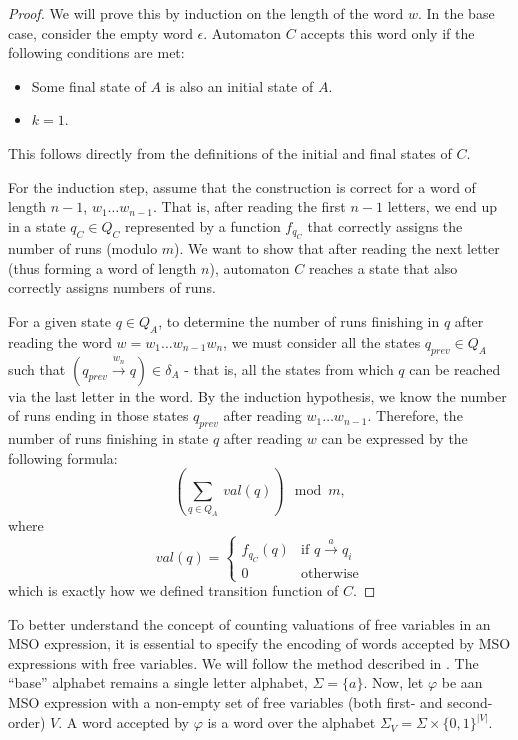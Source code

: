 \documentclass[12pt]{article}
\theoremstyle{definition}
\begin{document}
\begin{proof}
    We will prove this by induction on the length of the word $w$. In the base case, consider the empty word $\epsilon$. Automaton $C$ accepts this word only if the following conditions are met:
    \begin{itemize}
        \item Some final state of $A$ is also an initial state of $A$.
        \item $k = 1$.
    \end{itemize}
    This follows directly from the definitions of the initial and final states of $C$.
    
    For the induction step, assume that the construction is correct for a word of length $n-1$, $w_1 \ldots w_{n-1}$. That is, after reading the first $n-1$ letters, we end up in a state $q_C \in Q_C$ represented by a function $f_{q_C}$ that correctly assigns the number of runs (modulo $m$). We want to show that after reading the next letter (thus forming a word of length $n$), automaton $C$ reaches a state that also correctly assigns numbers of runs. 
    
    For a given state $q \in Q_A$, to determine the number of runs finishing in $q$ after reading the word $w = w_1\ldots w_{n-1}w_n$, we must consider all the states $q_{prev} \in Q_A$ such that $(q_{prev} \xrightarrow{w_n} q) \in \delta_A$ - that is, all the states from which $q$ can be reached via the last letter in the word. By the induction hypothesis, we know the number of runs ending in those states $q_{prev}$ after reading $w_1 \ldots w_{n-1}$. Therefore, the number of runs finishing in state $q$ after reading $w$ can be expressed by the following formula:
    $$(\sum_{q \in Q_A} \ val(q)) \mod m,$$
    where
    \begin{equation*}
        val(q) =
            \begin{cases}
            f_{q_C}(q) & \text{if $q \xrightarrow{a} q_i$} \\
            0 & \text{otherwise}
            \end{cases}       
    \end{equation*}
    which is exactly how we defined transition function of $C$.
\end{proof}

To better understand the concept of counting valuations of free variables in an MSO expression, it is essential to specify the encoding of words accepted by MSO expressions with free variables. We will follow the method described in \cite{KreutzerR13}. The ``base'' alphabet remains a single letter alphabet, $\Sigma = \{a\}$. Now, let $\varphi$ be aan MSO expression with a non-empty set of free variables (both first- and second-order) $V$. A word accepted by $\varphi$ is a word over the alphabet $\Sigma_V = \Sigma \times \{0, 1\}^{|V|}$. 
\end{document}
